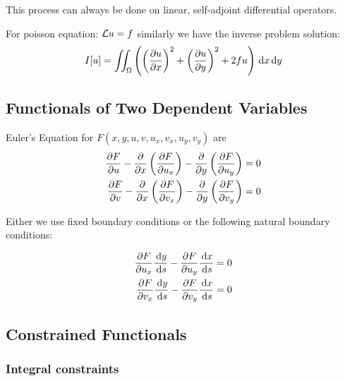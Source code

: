 \documentclass{article}
\begin{document}
\begin{remark}
    This process can always be done on linear, self-adjoint differential operators.
\end{remark}

\begin{remark}
    For poisson equation: \(\mathcal{L} u = f\) similarly we have the inverse problem solution: 
    \[ I[u] = \iint_\Omega \left( \left( \frac{\partial u}{\partial x} \right)^2+\left( \frac{\partial u}{\partial y} \right)^2+2fu  \right)\,\mathrm{d} x\,\mathrm{d} y \]
\end{remark}

\subsection{Functionals of Two Dependent Variables}

\begin{theorem}
    Euler's Equation for \(F(x,y,u,v,u_x,v_x,u_y,v_y)\) are
    \begin{align*}
        \frac{\partial F}{\partial u}-\frac{\partial}{\partial x}\left( \frac{\partial F}{\partial u_x} \right)-\frac{\partial}{\partial y}\left( \frac{\partial F}{\partial u_y} \right)=0\\
        \frac{\partial F}{\partial v}-\frac{\partial}{\partial x}\left( \frac{\partial F}{\partial v_x} \right)-\frac{\partial}{\partial y}\left( \frac{\partial F}{\partial v_y} \right)=0
    \end{align*}

    Either we use fixed boundary conditions or the following natural boundary conditions:

    \begin{align*}
        \frac{\partial F}{\partial u_x}\frac{\,\mathrm{d} y}{\,\mathrm{d} s}-\frac{\partial F}{\partial u_y}\frac{\,\mathrm{d} x}{\,\mathrm{d} s}=0\\
        \frac{\partial F}{\partial v_x}\frac{\,\mathrm{d} y}{\,\mathrm{d} s}-\frac{\partial F}{\partial v_y}\frac{\,\mathrm{d} x}{\,\mathrm{d} s}=0
    \end{align*}
\end{theorem}

\subsection{Constrained Functionals}

\subsubsection*{Integral constraints}
\end{document}
